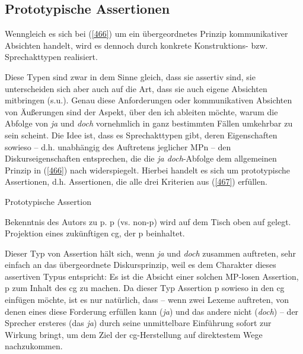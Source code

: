 \subsection{Prototypische Assertionen}
Wenngleich es sich bei (\ref{466}) um ein übergeordnetes Prinzip kommunikativer Absichten handelt, wird es dennoch durch konkrete Konstruktions- bzw. Sprechakttypen  realisiert.

Diese Typen sind zwar in dem Sinne gleich, dass sie assertiv  sind, sie unterscheiden sich aber auch auf die Art, dass sie auch eigene Absichten mitbringen (s.u.). Genau diese Anforderungen oder kommunikativen Absichten von Äußerungen sind der Aspekt, über den ich ableiten möchte, warum die Abfolge von \textit{ja} und \textit{doch} vornehmlich in ganz bestimmten Fällen umkehrbar zu sein scheint. Die Idee ist, dass es Sprechakttypen gibt, deren Eigenschaften sowieso – d.h. unabhängig des Auftretens jeglicher MPn – den Diskurseigenschaften entsprechen, die die \textit{ja doch}-Abfolge dem allgemeinen Prinzip in (\ref{466}) nach widerspiegelt. Hierbei handelt es sich  um prototypische Assertionen, d.h. Assertionen, die alle drei Kriterien aus (\ref{467}) erfüllen.

\begin{exe}
	\ex\label{467} Prototypische Assertion
 		\begin{xlist}
			\ex\label{467a} Bekenntnis des Autors zu p.
 			\ex\label{467b}	p (vs. non-p) wird auf dem Tisch oben auf gelegt.
 			\ex\label{467c}	Projektion eines zukünftigen cg, der p beinhaltet.
 		\end{xlist}			
 		\hfill\hbox{\citet[92]{Farkas2010}}
\end{exe}
Dieser Typ von Assertion hält sich, wenn \textit{ja} und \textit{doch} zusammen auftreten, sehr einfach an das übergeordnete Diskursprinzip, weil es dem Charakter dieses assertiven Typus entspricht: Es ist die Absicht einer solchen MP-losen Assertion, p zum Inhalt des cg zu machen. Da dieser Typ Assertion p sowieso in den cg einfügen möchte, ist es nur natürlich, dass – wenn zwei Lexeme auftreten, von denen eines diese Forderung erfüllen kann (\textit{ja}) und das andere nicht (\textit{doch}) – der Sprecher ersteres (das \textit{ja}) durch seine unmittelbare Einführung sofort zur Wirkung bringt, um dem Ziel der cg-Herstellung auf direktestem Wege nach\-zukommen.

